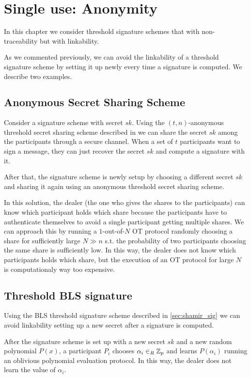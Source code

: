 \chapter{Single use: Anonymity}
\label{chap:single}
In this chapter we consider threshold signature schemes that with non-traceability but with linkability.

As we commented previously, we can avoid the linkability of a threshold signature scheme by setting it up newly every time a signature is computed. We describe two examples.

\section{Anonymous Secret Sharing Scheme}
Consider a signature scheme with secret $sk$. Using the $(t,n)$-anonymous threshold secret sharing scheme described in \cite{BlSt97} we can share the secret $sk$ among the participants through a secure channel. When a set of $t$ participants want to sign a message, they can just recover the secret $sk$ and compute a signature with it.

After that, the signature scheme is newly setup by choosing a different secret $sk$ and sharing it again using an anonymous threshold secret sharing scheme.

In this solution, the dealer (the one who gives the shares to the participants) can know which participant holds which share because the participants have to authenticate themselves to avoid a single participant getting multiple shares. We can approach this by running a $1$-out-of-$N$ OT protocol randomly choosing a share for sufficiently large $N \gg n$ s.t. the probability of two participants choosing the same share is sufficiently low. In this way, the dealer does not know which participants holds which share, but the execution of an OT protocol for large $N$ is computationaly way too expensive.

\section{Threshold BLS signature}
Using the BLS threshold signature scheme described in \ref{sec:shamir_sig} we can avoid linkability setting up a new secret after a signature is computed.

After the signature scheme is set up with a new secret $sk$ and a new random polynomial $P(x)$, a participant $P_i$ chooses $\alpha_i \in_R {\mathbb Z}_p$ and learns $P(\alpha_i)$ running an oblivious polynomial evaluation protocol. In this way, the dealer does not learn the value of $\alpha_i$.

